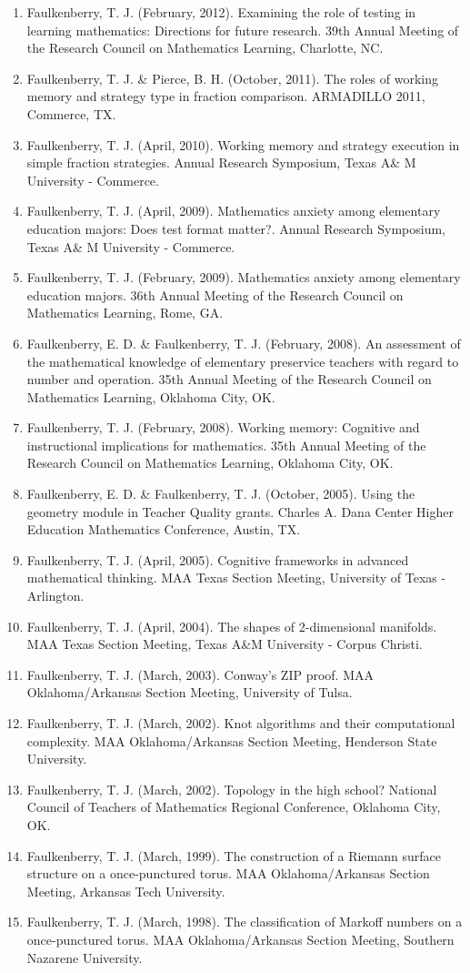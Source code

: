 \documentclass[article,10pt]{article}
\begin{document}
\begin{enumerate}
\item Faulkenberry, T. J. (February, 2012). Examining the role of testing in learning mathematics: Directions for future research. 39th Annual Meeting of the Research Council on Mathematics Learning, Charlotte, NC.
\item Faulkenberry, T. J. \& Pierce, B. H. (October, 2011). The roles of working memory and strategy type in fraction comparison. ARMADILLO 2011, Commerce, TX.
\item Faulkenberry, T. J. (April, 2010). Working memory and strategy execution in simple fraction strategies. Annual Research Symposium, Texas A\& M University - Commerce.
\item Faulkenberry, T. J. (April, 2009). Mathematics anxiety among elementary education majors: Does test format matter?. Annual Research Symposium, Texas A\& M University - Commerce.
\item Faulkenberry, T. J. (February, 2009). Mathematics anxiety among elementary education majors. 36th Annual Meeting of the Research Council on Mathematics Learning, Rome, GA.
\item Faulkenberry, E. D. \& Faulkenberry, T. J. (February, 2008). An assessment of the mathematical knowledge of elementary preservice teachers with regard to number and operation. 35th Annual Meeting of the Research Council on Mathematics Learning, Oklahoma City, OK.
\item Faulkenberry, T. J. (February, 2008). Working memory: Cognitive and instructional implications for mathematics. 35th Annual Meeting of the Research Council on Mathematics Learning, Oklahoma City, OK.
\item Faulkenberry, E. D. \& Faulkenberry, T. J. (October, 2005). Using the geometry module in Teacher Quality grants. Charles A. Dana Center Higher Education Mathematics Conference, Austin, TX.
\item Faulkenberry, T. J. (April, 2005). Cognitive frameworks in advanced mathematical thinking. MAA Texas Section Meeting, University of Texas - Arlington.
\item Faulkenberry, T. J. (April, 2004). The shapes of 2-dimensional manifolds. MAA Texas Section Meeting, Texas A\&M University - Corpus Christi.
\item Faulkenberry, T. J. (March, 2003). Conway’s ZIP proof. MAA Oklahoma/Arkansas Section Meeting, University of Tulsa.
\item Faulkenberry, T. J. (March, 2002). Knot algorithms and their computational complexity. MAA Oklahoma/Arkansas Section Meeting, Henderson State University.
\item Faulkenberry, T. J. (March, 2002). Topology in the high school? National Council of Teachers of Mathematics Regional Conference, Oklahoma City, OK.
\item Faulkenberry, T. J. (March, 1999). The construction of a Riemann surface structure on a once-punctured torus. MAA Oklahoma/Arkansas Section Meeting, Arkansas Tech University.
\item Faulkenberry, T. J. (March, 1998). The classification of Markoff numbers on a once-punctured torus. MAA Oklahoma/Arkansas Section Meeting, Southern Nazarene University.
\end{enumerate}
\end{document}
